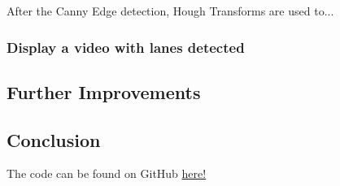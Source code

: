 \documentclass[conference]{IEEEtran}
\begin{document}
After the Canny Edge detection, Hough Transforms are used to...

\subsubsection{Display a video with lanes detected}


\subsection{Further Improvements}

\subsection{Conclusion}




The code can be found on GitHub \href{https://github.com/LukeDWaller99/Aint308}{here!} 

\onecolumn

\begin{appendix}

\end{appendix}
\end{document}
